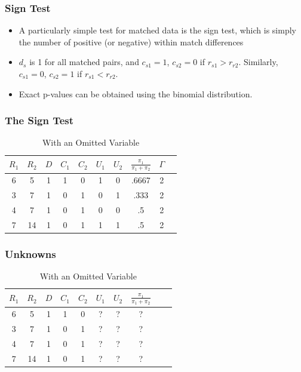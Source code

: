 \documentclass{beamer}
\begin{document}
\begin{frame}
  \frametitle{Sign Test}
  \begin{itemize}
  \item<+-> A particularly simple test for matched data is the sign test, which is simply the number of positive (or negative) within match differences
\item $d_s$ is 1 for all matched pairs, and $c_{s1}=1$, $c_{s2}=0$ if $r_{s1}>r_{r2}$. Similarly, $c_{s1}=0$, $c_{s2}=1$ if  $r_{s1}<r_{r2}$.
\item<+-> Exact p-values can be obtained using the binomial distribution.
  \end{itemize}
  \end{frame}

\begin{frame}[c]\frametitle{The Sign Test}
	\begin{table}
		\begin{center}
			\begin{tabular}{cccccccccc}
				$R_1$ & $R_2$ & $D$ & $C_1$ &$C_2$  & $U_1$ & $U_2$ & $\frac{\pi_1}{\pi_1 + \pi_2}$ & $\Gamma $\\ \hline
				6 & 5 & 1 & 1 & 0  & 1 & 0 &  .6667 &2 \\
				3 & 7 & 1 & 0 & 1  & 0 & 1 & .333 &2 \\
				4 & 7 & 1 & 0 & 1  & 0 & 0 &  .5 & 2\\
				7 & 14 & 1 & 0 & 1  & 1 & 1 & .5 & 2 \\
			\end{tabular}
		\end{center}
		\caption{With an Omitted Variable}
	\end{table}
	

\end{frame}

\begin{frame}[c]\frametitle{Unknowns}
	\begin{table}
		\begin{center}
			\begin{tabular}{cccccccccc}
				$R_1$ & $R_2$ & $D$ & $C_1$ &$C_2$  & $U_1$ & $U_2$ & $\frac{\pi_1}{\pi_1 + \pi_2}$ \\ \hline
				6 & 5 & 1 & 1 & 0  & ? & ? &  ?\\
				3 & 7 & 1 & 0 & 1  & ? & ? & ?  \\
				4 & 7 & 1 & 0 & 1  & ? & ? &  ?\\
				7 & 14 & 1 & 0 & 1  & ? & ? & ? \\
			\end{tabular}
		\end{center}
		\caption{With an Omitted Variable}
	\end{table}
\end{frame}
\end{document}
